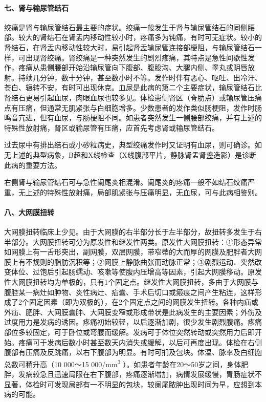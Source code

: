 \paragraph{七、肾与输尿管结石}

绞痛是肾与输尿管结石最主要的症状。绞痛一般发生于肾与输尿管结石的同侧腰部。较大的肾结石在肾盂内移动性较小时，疼痛多为钝痛，有时可无症状。较小的肾结石，在肾盂内移动性较大时，易引起肾盂输尿管连接部梗阻，与输尿管结石一样，可出现肾绞痛。肾绞痛是一种突然发生的剧烈疼痛，其特点是急性间歇性发作，疼痛从患侧腰部开始沿输尿管向下腹部、腹股沟、大腿内侧、睾丸或阴唇放射。持续几分钟，数十分钟，甚至数小时不等。发作时伴有恶心、呕吐、出冷汗、苍白、辗转不安，有时可出现休克。血尿是此病的第二个主要症状，输尿管结石比肾结石更易引起血尿，肉眼血尿也较多见。体检患侧肾区（脊肋点）或输尿管压痛点有压痛，但通常无肌紧张与白细胞增多。少数患者的发作类似肠梗阻，发作时肠鸣音亢进，但有血尿，与肠梗阻不同。如患者突然发生一侧腰部绞痛，并有上述的特殊性放射痛，肾区或输尿管有压痛，应首先考虑肾或输尿管结石。

过去尿中有排出结石或小砂粒病史，典型绞痛发作时又证明有血尿，则可确诊。如无上述的典型病象，B超和X线检查（X线腹部平片，静脉肾盂肾盏造影）是诊断此病的重要方法。

右侧肾与输尿管结石可与急性阑尾炎相混淆。阑尾炎的疼痛一般不如结石绞痛严重，无上述的特殊性放射痛，局部肌紧张与压痛明显，无血尿，可与此病相鉴别。

\paragraph{八、大网膜扭转}

大网膜扭转临床上少见。由于大网膜的右半部分长于左半部分，故扭转多发生于右半部分。大网膜扭转可分为原发性和继发性两类。原发性大网膜扭转：①形态异常如网膜上有一舌形突出，副网膜，双层网膜，带窄蒂的大而厚的网膜及肥胖者大网膜上有不规则的脂肪沉积等；②网膜上静脉曲张而动脉正常；③剧烈运动、突然改变体位、过饱后引起肠蠕动、咳嗽等使腹内压增高等因素，引起大网膜移动。原发性大网膜扭转均为单极的，只有1个固定点。继发性大网膜扭转，多由于大网膜与腹腔某一病灶如肿物、炎性病灶、疝囊、手术后切口或瘢痕之间产生粘连，这样形成了2个固定因素（即为双极的），在2个固定点之间的网膜发生扭转。各种内疝或外疝、肥胖、大网膜囊肿、大网膜变窄或形成带状是此病发生的主要因素；外伤及过度用力是发病的诱因。疼痛初始较轻，以后逐渐加剧，很少发生剧烈腹痛。疼痛部位多较固定，可于卧位或弯腰而缓解。发病可于体位突然转动或突然用力后即开始。疼痛可于发病后数小时甚至数天内消失或缓解，以后可再度出现。体检在右侧腹部有压痛及反跳痛，以右下腹部为明显。有时可扪及包块。体温、脉率及白细胞总数可稍升高（10
000～15 000/mm\textsuperscript{3}
）。如患者年龄在20～50岁之间，身体肥胖，发病较急且迅速局限在右下腹部，疼痛逐渐增加，病情发展缓慢，胃肠症状不显著，体检时可发现局部有一不明显的包块，较阑尾脓肿出现时间为早，应想到本病的可能。

